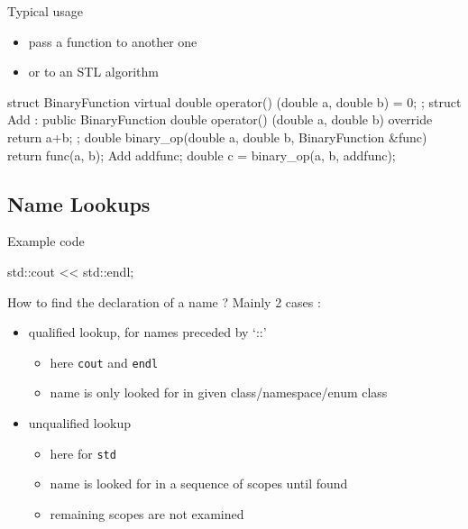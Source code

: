 \begin{frame}[fragile]
  \begin{block}{Typical usage}
    \begin{itemize}
    \item pass a function to another one
    \item or to an STL algorithm
    \end{itemize}
  \end{block}
  \begin{cppcode}
    struct BinaryFunction {
      virtual double operator() (double a, double b) = 0;
    };
    struct Add : public BinaryFunction {
      double operator() (double a, double b) override
      { return a+b; }
    };
    double binary_op(double a, double b, BinaryFunction &func) {
      return func(a, b);
    }
    Add addfunc;
    double c = binary_op(a, b, addfunc);
  \end{cppcode}
\end{frame}

\subsection[ADL]{Name Lookups}

\begin{frame}[fragile]
  \begin{exampleblock}{Example code}
    \begin{cppcode}
      std::cout << std::endl;
    \end{cppcode}
  \end{exampleblock}
  \begin{block}{How to find the declaration of a name ?}
    Mainly 2 cases :
    \begin{itemize}
    \item qualified lookup, for names preceded by `::'
      \begin{itemize}
      \item here \texttt{cout} and \texttt{endl}
      \item name is only looked for in given class/namespace/enum class
      \end{itemize}
    \item unqualified lookup
      \begin{itemize}
      \item here for \texttt{std}
      \item name is looked for in a sequence of scopes until found
      \item remaining scopes are not examined
      \end{itemize}
    \end{itemize}
  \end{block}
\end{frame}

